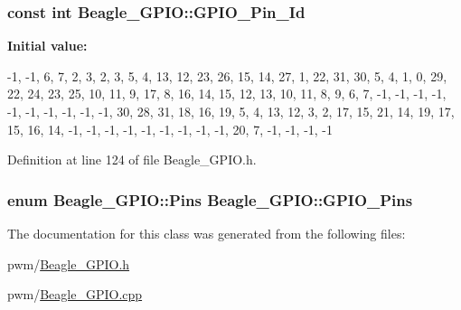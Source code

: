 \hypertarget{class_beagle___g_p_i_o_a9a48339b54de8e6c884ddad8629a3647}{
\subsubsection[{\-G\-P\-I\-O\-\_\-\-Pin\-\_\-\-Id}]{\setlength{\rightskip}{0pt plus 5cm}const int {\bf \-Beagle\-\_\-\-G\-P\-I\-O\-::\-G\-P\-I\-O\-\_\-\-Pin\-\_\-\-Id}}}\label{class_beagle___g_p_i_o_a9a48339b54de8e6c884ddad8629a3647}
{\bfseries \-Initial value\-:}
\begin{DoxyCode}
 
{
        -1, -1,  6,  7,  2,     
         3,  2,  3,  5,  4,     
        13, 12, 23, 26, 15,     
        14, 27,  1, 22, 31,     
        30,  5,  4,  1,  0,     
        29, 22, 24, 23, 25,     
        10, 11,  9, 17,  8,     
        16, 14, 15, 12, 13,     
        10, 11,  8,  9,  6,     
         7,                     
        -1, -1, -1, -1, -1,     
        -1, -1, -1, -1, -1,     
        30, 28, 31, 18, 16,     
        19,  5,  4, 13, 12,     
         3,  2, 17, 15, 21,     
        14, 19, 17, 15, 16,     
        14, -1, -1, -1, -1,     
        -1, -1, -1, -1, -1,     
        20,  7, -1, -1, -1,     
        -1                      
}
\end{DoxyCode}


\-Definition at line 124 of file \-Beagle\-\_\-\-G\-P\-I\-O.\-h.

\hypertarget{class_beagle___g_p_i_o_ae173a49845ccc4d980cc0eb83a990418}{
\subsubsection[{\-G\-P\-I\-O\-\_\-\-Pins}]{\setlength{\rightskip}{0pt plus 5cm}enum {\bf \-Beagle\-\_\-\-G\-P\-I\-O\-::\-Pins}  {\bf \-Beagle\-\_\-\-G\-P\-I\-O\-::\-G\-P\-I\-O\-\_\-\-Pins}}}\label{class_beagle___g_p_i_o_ae173a49845ccc4d980cc0eb83a990418}


\-The documentation for this class was generated from the following files\-:\begin{DoxyCompactItemize}
\item 
pwm/\hyperlink{_beagle___g_p_i_o_8h}{\-Beagle\-\_\-\-G\-P\-I\-O.\-h}\item 
pwm/\hyperlink{_beagle___g_p_i_o_8cpp}{\-Beagle\-\_\-\-G\-P\-I\-O.\-cpp}\end{DoxyCompactItemize}
